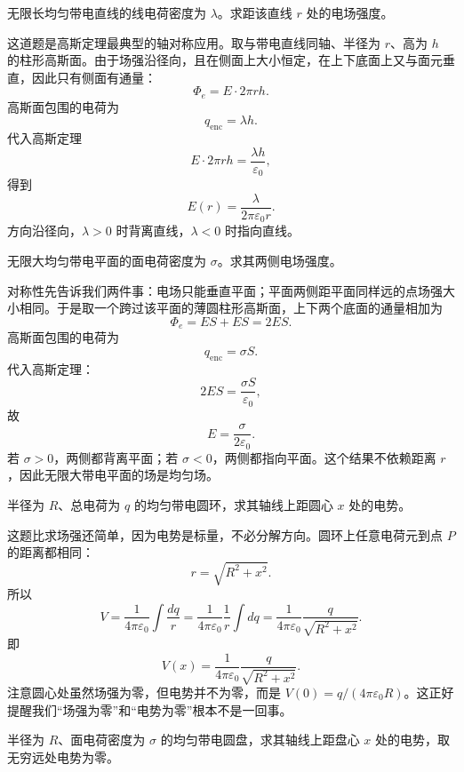 \documentclass[lang=cn,11pt]{elegantbook}
\begin{document}
\begin{example}[无限长均匀带电直线的场强]
无限长均匀带电直线的线电荷密度为 \(\lambda\)。求距该直线 \(r\) 处的电场强度。
\end{example}

\begin{solution}
这道题是高斯定理最典型的轴对称应用。取与带电直线同轴、半径为 \(r\)、高为 \(h\) 的柱形高斯面。由于场强沿径向，且在侧面上大小恒定，在上下底面上又与面元垂直，因此只有侧面有通量：
\[
\Phi_e=E\cdot 2\pi rh.
\]
高斯面包围的电荷为
\[
q_{\mathrm{enc}}=\lambda h.
\]
代入高斯定理
\[
E\cdot 2\pi rh=\frac{\lambda h}{\varepsilon_0},
\]
得到
\[
\boxed{
E(r)=\frac{\lambda}{2\pi\varepsilon_0 r}
}.
\]
方向沿径向，\(\lambda>0\) 时背离直线，\(\lambda<0\) 时指向直线。
\end{solution}

\begin{example}[无限大均匀带电平面的场强]
无限大均匀带电平面的面电荷密度为 \(\sigma\)。求其两侧电场强度。
\end{example}

\begin{solution}
对称性先告诉我们两件事：电场只能垂直平面；平面两侧距平面同样远的点场强大小相同。于是取一个跨过该平面的薄圆柱形高斯面，上下两个底面的通量相加为
\[
\Phi_e=ES+ES=2ES.
\]
高斯面包围的电荷为
\[
q_{\mathrm{enc}}=\sigma S.
\]
代入高斯定理：
\[
2ES=\frac{\sigma S}{\varepsilon_0},
\]
故
\[
\boxed{
E=\frac{\sigma}{2\varepsilon_0}
}.
\]
若 \(\sigma>0\)，两侧都背离平面；若 \(\sigma<0\)，两侧都指向平面。这个结果不依赖距离 \(r\)，因此无限大带电平面的场是均匀场。
\end{solution}

\begin{example}[均匀带电圆环轴线上的电势]
半径为 \(R\)、总电荷为 \(q\) 的均匀带电圆环，求其轴线上距圆心 \(x\) 处的电势。
\end{example}

\begin{solution}
这题比求场强还简单，因为电势是标量，不必分解方向。圆环上任意电荷元到点 \(P\) 的距离都相同：
\[
r=\sqrt{R^2+x^2}.
\]
所以
\[
V=\frac{1}{4\pi\varepsilon_0}\int\frac{dq}{r}
=\frac{1}{4\pi\varepsilon_0}\frac{1}{r}\int dq
=\frac{1}{4\pi\varepsilon_0}\frac{q}{\sqrt{R^2+x^2}}.
\]
即
\[
\boxed{
V(x)=\frac{1}{4\pi\varepsilon_0}\frac{q}{\sqrt{R^2+x^2}}
}.
\]
注意圆心处虽然场强为零，但电势并不为零，而是 \(V(0)=q/(4\pi\varepsilon_0R)\)。这正好提醒我们“场强为零”和“电势为零”根本不是一回事。
\end{solution}

\begin{example}[均匀带电圆盘轴线上的电势]
半径为 \(R\)、面电荷密度为 \(\sigma\) 的均匀带电圆盘，求其轴线上距盘心 \(x\) 处的电势，取无穷远处电势为零。
\end{example}
\end{document}
